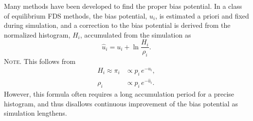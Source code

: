 \documentclass[reprint, superscriptaddress, floatfix]{revtex4-1}
\newcommand{\note}[1]{{\color{DarkGreen}\footnotesize \textsc{Note.} #1}}
\begin{document}
Many methods\cite{mezei1987, berg1992, *lee1993,
wang2001, wang2001pre, huber1994,
*laio2002, *laio2008, *barducci2011, *sutto2012}
have been developed to find the proper bias potential.
%
In a class of equilibrium FDS methods\cite{
  mezei1987, berg1992, *lee1993, marinari1992, *lyubartsev1992},
the bias potential, $u_i$, is
estimated a priori and fixed
during simulation,
%
and a correction to the bias potential
is derived from the normalized histogram, $H_i$,
accumulated from the simulation as
%
%
\begin{equation}
  \hat u_i
  =
  u_i
  +
  \ln \frac{ H_i }
           { \rho_i }.
  \label{eq:vcorr_equil}
\end{equation}
%
\note{This follows from
  \begin{align*}
    H_i \approx \pi_i
    &\propto p_i \, e^{-u_i},
    \\
    \rho_i
    &\propto p_i \, e^{-\hat u_i}.
  \end{align*}
}
However, this formula often requires a long
accumulation period for a precise histogram,
and thus disallows
continuous improvement of the bias potential
as simulation lengthens.
\end{document}
